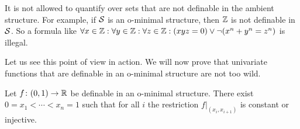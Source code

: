 \begin{warning}
  It is not allowed to quantify over sets that are not definable in
  the ambient structure. For example, if ${\mathcal S}$ is an o-minimal
  structure, then ${\mathbb{Z}}$ is not definable in ${\mathcal S}$. So a formula like
  $\forall x \in{\mathbb{Z}}:\forall y\in{\mathbb{Z}} :\forall z\in {\mathbb{Z}} :
  (xyz=0) \vee \neg(x^n+y^n=z^n)$ is illegal.
\end{warning}

Let us see this point of view in action. We will now prove that
univariate functions that are definable in an o-minimal structure are
not too wild.

\begin{lemma}
  \label{lem:piecewisecnstinjective}
  Let $f\colon (0,1)\rightarrow{\mathbb{R}}$ be definable in an o-minimal
  structure. There exist $0=x_1<\cdots <x_n =1$
  such that for all $i$ the restriction  $f|_{(x_i,x_{i+1})}$
  is constant or injective. 
\end{lemma}

